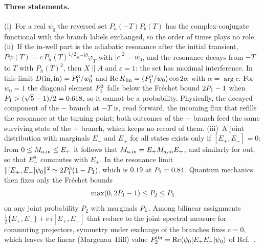 \paragraph{Three statements.}
(i)~For a real $\psi_0$ the reversed set $P_a(-T)P_b(T)$ has the complex-conjugate functional with the branch labels exchanged, so the order of times plays no role.
(ii)~If the in-well part is the adiabatic resonance after the initial transient, $P\psi(T)=c\,P_h(T)^{1/2}e^{-i\theta}\varphi_T$ with $|c|^2=w_0$, and the resonance decays from $-T$ to $T$ with $P_h(T)^2$, then $X\parallel A$ and $\varepsilon=1$: the set has maximal interference.
In this limit $D({\rm in},{\rm in})=P_1^3/w_0^2$ and ${\rm Re}\,K_{\rm lin}=(P_1^2/w_0)\cos2\alpha$ with $\alpha=\arg c$.
For $w_0=1$ the diagonal element $P_1^3$ falls below the Fr\'echet bound $2P_1-1$ when $P_1>(\sqrt5-1)/2=0.618$, so it cannot be a probability. %
Physically, the decayed component of the $-$ branch at $-T$ is, read forward, the incoming flux that refills the resonance at the turning point; both outcomes of the $-$ branch feed the same surviving state of the $+$ branch, which keeps no record of them.
(iii)~A joint distribution with marginals $E_-$ and $E_+$ for all states exists only if $[E_+,E_-]=0$: from $0\le M_{a,{\rm in}}\le E_+$ it follows that $M_{a,{\rm in}}=E_+M_{a,{\rm in}}E_+$, and similarly for out, so that $E_-^a$ commutes with $E_+$.
In the resonance limit $\|[E_+,E_-]\psi_0\|^2\simeq2P_1^3(1-P_1)$, which is $0.19$ at $P_1=0.84$. %
Quantum mechanics then fixes only the Fr\'echet bounds
\begin{equation}
\max(0,2P_1-1)\le P_2\le P_1
\label{eq:rb-frechet}
\end{equation}
on any joint probability $P_2$ with marginals $P_1$.
Among bilinear assignments $\frac12\{E_+,E_-\}+c\,i[E_+,E_-]$ that reduce to the joint spectral measure for commuting projectors, symmetry under exchange of the branches fixes $c=0$, which leaves the linear (Margenau--Hill) value $P_2^{\rm lin}={\rm Re}\langle\psi_0|E_+E_-|\psi_0\rangle$ of Ref.~\cite{Goldstein:1994cp}.

